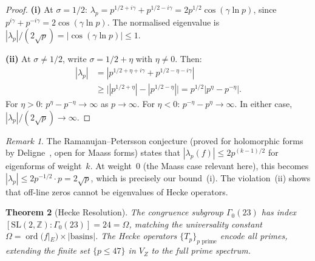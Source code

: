\documentclass[11pt,a4paper]{article}
\theoremstyle{plain}
\newtheorem{theorem}{Theorem}[section]
\theoremstyle{remark}
\newtheorem{remark}[theorem]{Remark}
\newcommand{\Z}{\mathbb{Z}}
\DeclareMathOperator{\ord}{ord}
\begin{document}
\begin{proof}
\textbf{(i)} At $\sigma=1/2$:
$\lambda_p=p^{1/2+i\gamma}+p^{1/2-i\gamma}=2p^{1/2}\cos(\gamma\ln p)$,
since $p^{i\gamma}+p^{-i\gamma}=2\cos(\gamma\ln p)$.
The normalised eigenvalue is $|\lambda_p|/(2\sqrt{p})=|\cos(\gamma\ln p)|\leq 1$.

\textbf{(ii)} At $\sigma\neq 1/2$, write $\sigma=1/2+\eta$ with
$\eta\neq 0$.  Then:
\begin{align*}
  |\lambda_p|&=|p^{1/2+\eta+i\gamma}+p^{1/2-\eta-i\gamma}|\\
  &\geq\bigl||p^{1/2+\eta}|-|p^{1/2-\eta}|\bigr|
  =p^{1/2}|p^\eta-p^{-\eta}|.
\end{align*}
For $\eta>0$: $p^\eta-p^{-\eta}\to\infty$ as $p\to\infty$.
For $\eta<0$: $p^{-\eta}-p^\eta\to\infty$.
In either case, $|\lambda_p|/(2\sqrt{p})\to\infty$.
\end{proof}

\begin{remark}
The Ramanujan--Petersson conjecture (proved for holomorphic forms by
Deligne~\cite{deligne1974}, open for Maass forms) states that
$|\lambda_p(f)|\leq 2p^{(k-1)/2}$ for eigenforms of weight~$k$.
At weight~$0$ (the Maass case relevant here), this becomes
$|\lambda_p|\leq 2p^{-1/2}\cdot p=2\sqrt{p}$, which is precisely
our bound~(i).  The violation~(ii) shows that off-line zeros cannot
be eigenvalues of Hecke operators.
\end{remark}

\begin{theorem}[Hecke Resolution]\label{thm:hecke-resolution}
The congruence subgroup $\Gamma_0(23)$ has index
$[\mathrm{SL}(2,\Z):\Gamma_0(23)]=24=\Omega$,
matching the universality constant $\Omega=\ord(f|_E)\times|\text{basins}|$.
The Hecke operators $\{T_p\}_{p\text{ prime}}$ encode \emph{all} primes,
extending the finite set $\{p\leq 47\}$ in $V_Z$ to the full prime
spectrum.
\end{theorem}
\end{document}
